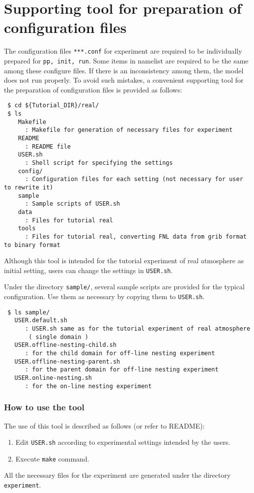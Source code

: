 \section{Supporting tool for preparation of configuration files} \label{sec:basic_makeconf}

The configuration files \verb|***.conf| for experiment are required to be individually prepared for \verb|pp, init, run|. Some items in namelist are required to be the same among these configure files. If there is an inconsistency among them, the model does not run properly. To avoid such mistakes, a convenient supporting tool for the preparation of configuration files is provided as follows:
\begin{verbatim}
 $ cd ${Tutorial_DIR}/real/
 $ ls
    Makefile 
      : Makefile for generation of necessary files for experiment
    README
      : README file
    USER.sh
      : Shell script for specifying the settings
    config/  
      : Configuration files for each setting (not necessary for user to rewrite it)
    sample
      : Sample scripts of USER.sh
    data
      : Files for tutorial real
    tools
      : Files for tutorial real, converting FNL data from grib format to binary format
\end{verbatim}
Although this tool is intended for the tutorial experiment of real atmosphere as initial setting, users can change the settings in \verb|USER.sh|.

Under the directory \verb|sample/|, several sample scripts are provided for the typical configuration. Use them as necessary by copying them to \verb|USER.sh|.
\begin{verbatim}
 $ ls sample/
   USER.default.sh                 
      : USER.sh same as for the tutorial experiment of real atmosphere
       ( single domain )
   USER.offline-nesting-child.sh   
      : for the child domain for off-line nesting experiment
   USER.offline-nesting-parent.sh  
      : for the parent domain for off-line nesting experiment
   USER.online-nesting.sh
      : for the on-line nesting experiment
\end{verbatim}


\subsubsection{How to use the tool}

The use of this tool is described as follows (or refer to README):
\begin{enumerate}
  \item Edit \verb|USER.sh| according to experimental settings intended by the users.
  \item Execute \verb|make| command.
\end{enumerate}
 All the necessary files for the experiment are generated under the directory \verb|experiment|.


